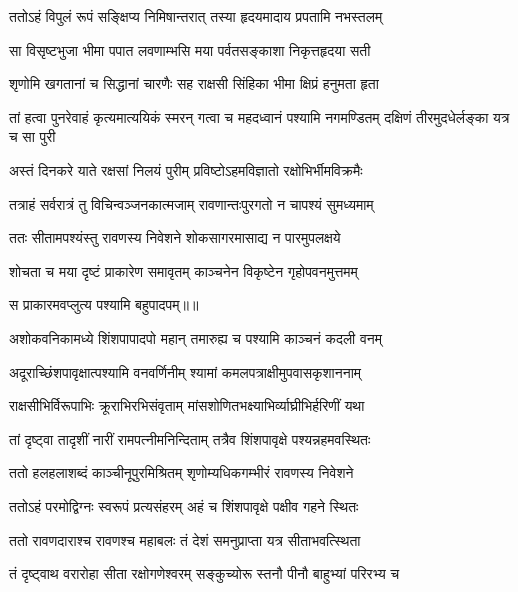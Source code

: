 \twolineshloka
{ततोऽहं विपुलं रूपं सङ्क्षिप्य निमिषान्तरात्}
{तस्या हृदयमादाय प्रपतामि नभस्तलम्} %

\twolineshloka
{सा विसृष्टभुजा भीमा पपात लवणाम्भसि}
{मया पर्वतसङ्काशा निकृत्तहृदया सती} %

\twolineshloka
{शृणोमि खगतानां च सिद्धानां चारणैः सह}
{राक्षसी सिंहिका भीमा क्षिप्रं हनुमता हृता} %

\threelineshloka
{तां हत्वा पुनरेवाहं कृत्यमात्ययिकं स्मरन्}
{गत्वा च महदध्वानं पश्यामि नगमण्डितम्}
{दक्षिणं तीरमुदधेर्लङ्का यत्र च सा पुरी} %

\twolineshloka
{अस्तं दिनकरे याते रक्षसां निलयं पुरीम्}
{प्रविष्टोऽहमविज्ञातो रक्षोभिर्भीमविक्रमैः} %

\twolineshloka
{तत्राहं सर्वरात्रं तु विचिन्वञ्जनकात्मजाम्}
{रावणान्तःपुरगतो न चापश्यं सुमध्यमाम्} %

\twolineshloka
{ततः सीतामपश्यंस्तु रावणस्य निवेशने}
{शोकसागरमासाद्य न पारमुपलक्षये} %

\twolineshloka
{शोचता च मया दृष्टं प्राकारेण समावृतम्}
{काञ्चनेन विकृष्टेन गृहोपवनमुत्तमम्} %

{स प्राकारमवप्लुत्य पश्यामि बहुपादपम्॥॥} %

\addtocounter{shlokacount}{1}

\twolineshloka
{अशोकवनिकामध्ये शिंशपापादपो महान्}
{तमारुह्य च पश्यामि काञ्चनं कदली वनम्} %

\twolineshloka
{अदूराच्छिंशपावृक्षात्पश्यामि वनवर्णिनीम्}
{श्यामां कमलपत्राक्षीमुपवासकृशाननाम्} %

\twolineshloka
{राक्षसीभिर्विरूपाभिः क्रूराभिरभिसंवृताम्}
{मांसशोणितभक्ष्याभिर्व्याघ्रीभिर्हरिणीं यथा} %

\twolineshloka
{तां दृष्ट्वा तादृशीं नारीं रामपत्नीमनिन्दिताम्}
{तत्रैव शिंशपावृक्षे पश्यन्नहमवस्थितः} %

\twolineshloka
{ततो हलहलाशब्दं काञ्चीनूपुरमिश्रितम्}
{शृणोम्यधिकगम्भीरं रावणस्य निवेशने} %

\twolineshloka
{ततोऽहं परमोद्विग्नः स्वरूपं प्रत्यसंहरम्}
{अहं च शिंशपावृक्षे पक्षीव गहने स्थितः} %

\twolineshloka
{ततो रावणदाराश्च रावणश्च महाबलः}
{तं देशं समनुप्राप्ता यत्र सीताभवत्स्थिता} %

\twolineshloka
{तं दृष्ट्वाथ वरारोहा सीता रक्षोगणेश्वरम्}
{सङ्कुच्योरू स्तनौ पीनौ बाहुभ्यां परिरभ्य च} %

